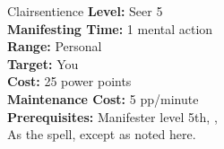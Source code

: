 {Clairsentience}
{
	\textbf{Level:}
	Seer 5\\
	\textbf{Manifesting Time:}
	1 mental action\\
	\textbf{Range:}
	Personal\\
	\textbf{Target:}
	You\\
	\textbf{Cost:}
	25 power points\\
	\textbf{Maintenance Cost:}
	5 pp/minute\\
	\textbf{Prerequisites:}
	Manifester level 5th, , \\
}
{
	As the  spell, except as noted here.
}